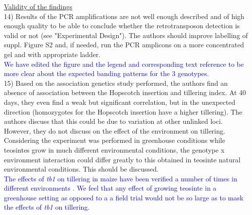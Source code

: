 \documentclass[11pt]{article}
\newcommand{\res}[1]{\noindent \textcolor{blue}{{#1}} \\}
\begin{document}
\underline{Validity of the findings}\\

14) Results of the PCR amplifications are not well enough described and of high enough quality to be able to conclude whether the retrotransposon detection is valid or not (see "Experimental Design"). The authors should improve labelling of suppl. Figure S2 and, if needed, run the PCR amplicons on a more concentrated gel and with appropriate ladder.\\

\res{We have edited the figure and the legend and corresponding text reference to be more clear about the expected banding patterns for the 3 genotypes.}

15) Based on the association genetics study performed, the authors find an absence of association between the Hopscotch insertion and tillering index. At 40 days, they even find a weak but significant correlation, but in the unexpected direction (homozygotes for the Hopscotch insertion have a higher tillering). The authors discuss that this could be due to variation at other unlinked loci. However, they do not discuss on the effect of the environment on tillering. Considering the experiment was performed in greenhouse conditions while teosintes grow in much different environmental conditions, the genotype x environment interaction could differ greatly to this obtained in teosinte natural environmental conditions. This should be discussed.\\

\res{The effects of \emph{tb1} on tillering in maize have been verified a number of times in different environments \citet{Briggs2007, Clark2006, StuderDoebley2012, Studer2011}. We feel that any effect of growing teosinte in a greenhouse setting as opposed to a a field trial would not be so large as to mask the effects of \emph{tb1} on tillering.}



\end{document}
